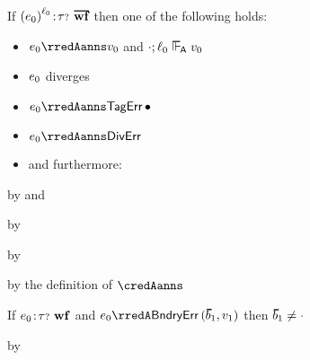 {\begin{theorem}\label{A-S-blame-correctness}
  If\/ $\fwellformedO{\obars{\sexpr_0}{\sowner_0}}{\stoptional}$ then one of the following holds:
  \begin{itemize}
    \item $\sexpr_0 \rredAanns \svalue_0$ and\/ $\snil; \sowner_0 \sWLA \svalue_0$
    \item $e_0$ diverges
    \item $\sexpr_0 \rredAanns \tagerrorD$
    \item $\sexpr_0 \rredAanns \divisionbyzeroerror$
    \item \Abcbeo{} and furthermore: \Abcitems
  \end{itemize}
\end{theorem}
\begin{lamportproof}\leavevmode
    \begin{pfproof}
      by  and 
    \end{pfproof}
    \begin{pfproof}
      by 
    \end{pfproof}
    \begin{pfproof}
      by 
    \end{pfproof}
    \begin{pfproof}
      by the definition of\/ $\credAanns$
    \end{pfproof}
\end{lamportproof}}

\begin{corollary}
  If\/ $e_0\!:\!{\tau{\scriptstyle ?}}~\mathbf{wf}$
  and\/ $\sexpr_0 \rredA \boundaryerror{\sblist_1}{\svalue_1}$
  then\/ $\sblist_1 \neq \snil$
\end{corollary}
\begin{lamportproof}
  by 
\end{lamportproof}

